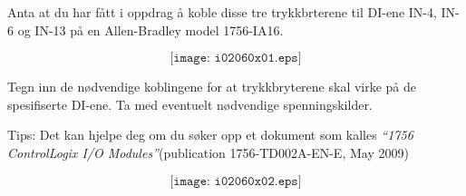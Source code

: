 

Anta at du har fått i oppdrag å koble disse tre trykkbrterene til DI-ene IN-4, IN-6 og IN-13 på en Allen-Bradley model 1756-IA16. 

$$\texttt{[image: i02060x01.eps]}$$

Tegn inn de nødvendige koblingene for at trykkbryterene skal virke på de spesifiserte DI-ene. Ta med eventuelt nødvendige spenningskilder. 


\vskip 10pt

Tips: Det kan hjelpe deg om du søker opp et dokument som kalles \textit{``1756 ControlLogix I/O Modules''}(publication 1756-TD002A-EN-E, May 2009)








$$\texttt{[image: i02060x02.eps]}$$











